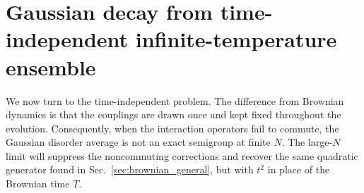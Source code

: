 \documentclass{article}
\theoremstyle{definition}
\begin{document}

\section{Gaussian decay from time-independent infinite-temperature ensemble}
\label{sec:quenched_general}

We now turn to the time-independent problem.  The difference from Brownian
dynamics is that the couplings are drawn once and kept fixed throughout the
evolution.  Consequently, when the interaction operators fail to commute,
the Gaussian disorder average is not an exact semigroup at finite $N$.
The large-$N$ limit will suppress the noncommuting corrections and recover
the same quadratic generator found in Sec.~\ref{sec:brownian_general}, but
with $t^2$ in place of the Brownian time $T$.
\end{document}
